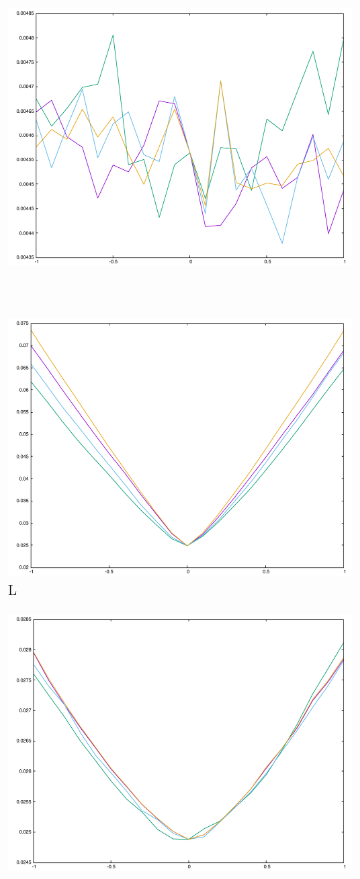 {\begin{figure}[H]
\begin{subfigure}{.33\textwidth}
	\includegraphics[width=\linewidth]{fig/ajherr/t3tr/S_chi.pdf}
\end{subfigure}\\
\begin{subfigure}{.33\textwidth}
	\includegraphics[width=\linewidth]{fig/ajherr/t3tr/L_mae.pdf}
	\caption{L}
\end{subfigure}%
\begin{subfigure}{.33\textwidth}
	\includegraphics[width=\linewidth]{fig/ajherr/t3tr/M_mae.pdf}

\end{subfigure}
\end{figure}}
